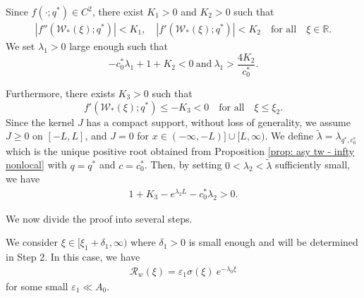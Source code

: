 \documentclass[11pt,a4paper]{article}
\numberwithin{equation}{section}
\numberwithin{figure}{section}
\newcommand\bea{\begin{eqnarray}}
\newcommand\eea{\end{eqnarray}}
\newcommand\beaa{\begin{eqnarray*}}
\newcommand\eeaa{\end{eqnarray*}}
\begin{document}
Since $f(\cdot;q^*)\in C^2$, there exist $K_1>0$ and $K_2>0$ such that
\bea\label{K1K2 nonlocal}
|f''({\mathcal{W}}_*(\xi);q^*)|< K_1,\quad |f'({\mathcal{W}}_*(\xi);q^*)|< K_2\quad \mbox{for all}\quad\xi\in\mathbb{R}.
\eea
We set $\lambda_1>0$ %
large enough such that
\begin{equation}\label{condition on lambda 1 nonlocal}
-c_0^*\lambda_1+1+K_2<0\ \text{and}\ \lambda_1>\frac{4K_2}{c_0^*}.
\end{equation}

Furthermore, there exists $K_3>0$ such that
\begin{equation}\label{condition on xi_2 scalar nonlocal}
f'({\mathcal{W}}_*(\xi); q^*)\le -K_3<0\quad\text{for all}\quad\xi\le \xi_2.
\end{equation}
Since the kernel $J$ has a compact support, without loss of generality, we assume $J\ge0$ on $[-L,L]$, and $J=0$ for $x\in(-\infty,-L)]\cup[L,\infty)$.
We define $\tilde\lambda=\lambda_{q^*,c^*_0}$ which is the unique positive root obtained from Proposition \ref{prop: asy tw - infty nonlocal} with $q=q^*$ and $c=c^*_0$.
Then, by setting $0<\lambda_2<\tilde\lambda$ sufficiently small, we have
\bea\label{lambda 2 nonlocal}
1+K_3-e^{\lambda_2L}-c_0^*\lambda_2>0.
\eea

We now divide the proof into several steps.

 We consider $\xi\in[\xi_1+\delta_1,\infty)$ where $\delta_1>0$ is small enough and will be determined in Step 2.
In this case, we have
\beaa
\mathcal{R}_w(\xi)=\varepsilon_1\sigma(\xi)\ e^{-\lambda_0\xi}
\eeaa
for some small $\varepsilon_1\ll A_0$.
\end{document}
